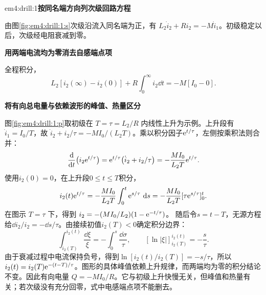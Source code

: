 \LectureAnswerSection

\begin{drillsolution}{em4:drill:1}\textbf{按同名端方向列次级回路方程}\par\nobreak
由图\ref{fig:em4:drill:1:s}次级沿流入同名端为正，有 $L_2\dot i_2+Ri_2=-M\dot i_1$。初级稳定以后，次级经电阻衰减到零。

\par\medskip{}\noindent\textbf{用两端电流均为零消去自感端点项}\par\nobreak
全程积分，
\[L_2[i_2(\infty)-i_2(0)]+R\int_0^\infty i_2\dd t=-M[I_0-0].\]



\par\medskip{}\noindent\textbf{将有向总电量与依赖波形的峰值、热量区分}\par\nobreak
图\ref{fig:em4:drill:1:p}取初级在 $T=\tau=L_2/R$ 内线性上升为示例。上升段有 $\dot i_1=I_0/T$，故
$\dot i_2+i_2/\tau=-MI_0/(L_2T)$。乘以积分因子$\mathrm e^{t/\tau}$，左侧按乘积法则合并：
\[
\frac{\mathop{}\!\mathrm d}{\mathop{}\!\mathrm d t}\bigl(i_2\mathrm e^{t/\tau}\bigr)
=\mathrm e^{t/\tau}\bigl(\dot i_2+i_2/\tau\bigr)
=-\frac{MI_0}{L_2T}\mathrm e^{t/\tau}.
\]
使用$i_2(0)=0$，在上升段$0\le t\le T$积分，
\[
i_2(t)\mathrm e^{t/\tau}
=-\frac{MI_0}{L_2T}\int_0^t\mathrm e^{s/\tau}\,\mathop{}\!\mathrm d s
=-\frac{MI_0}{L_2T}[\tau\mathrm e^{s/\tau}]_0^t.
\]
在图示 $T=\tau$ 下，得到
$i_2=-(MI_0/L_2)(1-\mathrm e^{-t/\tau})$。
随后令$s=t-T$，无源方程给$\dd i_2/i_2=-\dd s/\tau$。由接续初值$i_2(T)<0$确定积分边界：
\[
\int_{i_2(T)}^{i_2(t)}\frac{\dd \xi}{\xi}
=-\int_0^s\frac{\dd \sigma}{\tau},\qquad
[\ln|\xi|]_{i_2(T)}^{i_2(t)}=-\frac{s}{\tau}.
\]
由于衰减过程中电流保持负号，得到$\ln[i_2(t)/i_2(T)]=-s/\tau$，所以$i_2(t)=i_2(T)\mathrm e^{-(t-T)/\tau}$。图形的具体峰值依赖上升规律，而两端均为零的积分结论不变。因此有向电量 $Q=-MI_0/R$。它与初级上升快慢无关，但峰值和热量有关；若次级没有充分回零，式中电感端点项不能删去。\end{drillsolution}

